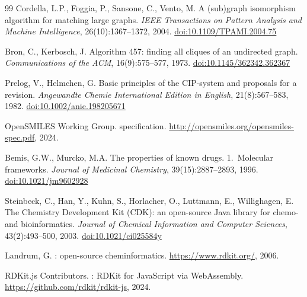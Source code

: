 \documentclass[twocolumn]{article}
\begin{document}
\begin{thebibliography}{99}
Cordella, L.P., Foggia, P., Sansone, C., Vento, M.
\newblock A (sub)graph isomorphism algorithm for matching large graphs.
\newblock \emph{IEEE Transactions on Pattern Analysis and Machine Intelligence},
  26(10):1367--1372, 2004.
\newblock \href{https://doi.org/10.1109/TPAMI.2004.75}{doi:10.1109/TPAMI.2004.75}

Bron, C., Kerbosch, J.
\newblock Algorithm 457: finding all cliques of an undirected graph.
\newblock \emph{Communications of the ACM}, 16(9):575--577, 1973.
\newblock \href{https://doi.org/10.1145/362342.362367}{doi:10.1145/362342.362367}

Prelog, V., Helmchen, G.
\newblock Basic principles of the CIP-system and proposals for a revision.
\newblock \emph{Angewandte Chemie International Edition in English},
  21(8):567--583, 1982.
\newblock \href{https://doi.org/10.1002/anie.198205671}{doi:10.1002/anie.198205671}

OpenSMILES Working Group.
 specification.
\newblock \url{http://opensmiles.org/opensmiles-spec.pdf}, 2024.

Bemis, G.W., Murcko, M.A.
\newblock The properties of known drugs. 1.~Molecular frameworks.
\newblock \emph{Journal of Medicinal Chemistry}, 39(15):2887--2893, 1996.
\newblock \href{https://doi.org/10.1021/jm9602928}{doi:10.1021/jm9602928}

Steinbeck, C., Han, Y., Kuhn, S., Horlacher, O., Luttmann, E., Willighagen, E.
\newblock The {Chemistry Development Kit (CDK)}: an open-source {Java} library
  for chemo- and bioinformatics.
\newblock \emph{Journal of Chemical Information and Computer Sciences},
  43(2):493--500, 2003.
\newblock \href{https://doi.org/10.1021/ci025584y}{doi:10.1021/ci025584y}

Landrum, G.
: open-source cheminformatics.
\newblock \url{https://www.rdkit.org/}, 2006.

RDKit.js Contributors.
: {RDKit} for {JavaScript} via {WebAssembly}.
\newblock \url{https://github.com/rdkit/rdkit-js}, 2024.

\end{thebibliography}
\end{document}
